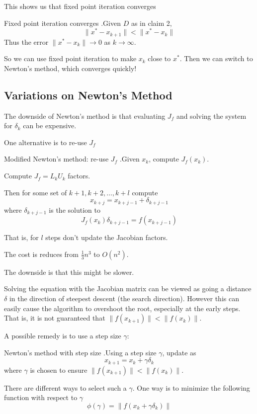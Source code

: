 \documentclass[12pt,letterpaper]{article}
\begin{document}
This shows us that fixed point iteration converges
\begin{theo}{Fixed point iteration converges}
.Given $D$ as in claim 2,
\begin{equation}
	\lVert x^* - x_{k+1} \rVert < \lVert x^* - x_k \rVert
\end{equation}
Thus the error $\lVert x^* - x_k \rVert \rightarrow 0$ as $k \rightarrow \infty$.
\end{theo}

So we can use fixed point iteration to make $x_k$ close to $x^*$. Then we can switch to Newton's method, which converges quickly!

\subsection{Variations on Newton's Method}
The downside of Newton's method is that evaluating $J_f$ and solving the system for $\delta_k$ can be expensive.

One alternative is to re-use $J_f$
\begin{algo}{Modified Newton's method: re-use $J_f$}
.Given $x_k$, compute $J_f(x_k)$.

Compute $J_f = L_k U_k$ factors.

Then for some set of $k+1, k+2, \dots, k+l$ compute
\begin{equation}
	x_{k+j} = x_{k+j-1} + \delta_{k+j-1}
\end{equation}
where $\delta_{k+j-1}$ is the solution to
\begin{equation}
	J_f(x_k) \delta_{k+j-1} = f(x_{k+j-1})
\end{equation}

That is, for $l$ steps don't update the Jacobian factors.

The cost is reduces from $\frac{1}{3}n^3$ to $O(n^2)$.

The downside is that this might be slower.
\end{algo}

Solving the equation with the Jacobian matrix can be viewed as going a distance $\delta$ in the direction of steepest descent (the search direction). However this can easily cause the algorithm to overshoot the root, especially at the early steps. That is, it is not guaranteed that $\lVert f(x_{k+1}) \rVert < \lVert f(x_k) \rVert$.

A possible remedy is to use a step size $\gamma$:
\begin{algo}{Newton's method with step size}
.Using a step size $\gamma$, update as
\begin{equation}
	x_{k+1} = x_k + \gamma \delta_k
\end{equation}
where $\gamma$ is chosen to ensure $\lVert f(x_{k+1}) \rVert < \lVert f(x_k) \rVert$.

There are different ways to select such a $\gamma$. One way is to minimize the following function with respect to $\gamma$
\begin{equation}
	\phi(\gamma) = \lVert f(x_k + \gamma \delta_k) \rVert
\end{equation}
\end{algo}
\end{document}
